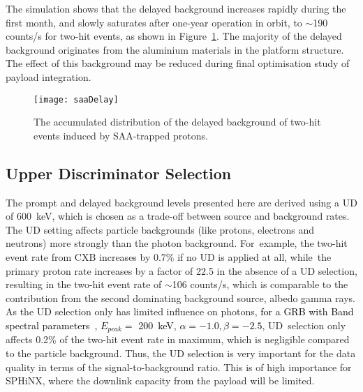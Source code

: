 \documentclass[galaxies,article,accept,moreauthors,pdftex,10pt,a4paper]{mdpi}
\begin{document}
The simulation shows that the delayed background increases rapidly during the first month, and slowly saturates after one-year operation in orbit, to $\sim$190 counts/s for two-hit events, as  shown in Figure~\ref{fig:saa}.
The majority of the delayed background originates from the aluminium materials in the platform structure. The effect of this background may be reduced during final optimisation study of payload integration.
\vspace{-12pt}

\begin{figure}[H]
\centering
\texttt{[image: saaDelay]}
\caption{The accumulated distribution of the delayed background of two-hit events induced by SAA-trapped protons.} %
\label{fig:saa}
\end{figure}


\subsection{Upper Discriminator Selection}
\label{sec:ud}
The prompt and delayed background levels presented here are derived using a UD of 600~keV, which is chosen as a trade-off between source and background rates. The UD setting affects particle backgrounds (like protons, electrons and neutrons) more strongly than the photon background. For~example, the two-hit event rate from CXB increases by 0.7\% if no UD is applied at all, while~the primary proton rate increases by a factor of 22.5 in the absence of a UD selection, resulting in the two-hit event rate of $\sim$106 counts/s, which is comparable to the contribution from the second dominating background source, albedo gamma rays. As the UD selection only has limited influence on photons, \textcolor{black}{for a GRB with Band
spectral parameters~\cite{ref:Band}, $E_{peak} =$ 200~keV, $\alpha = -1.0, \beta = -2.5$}, UD~selection only affects 0.2\% of the two-hit event rate in maximum, which is negligible compared to the particle background. Thus, the UD selection is very important for the data quality in terms of the signal-to-background ratio. This is of high importance for SPHiNX, where the downlink capacity from the payload will be limited.
\end{document}

